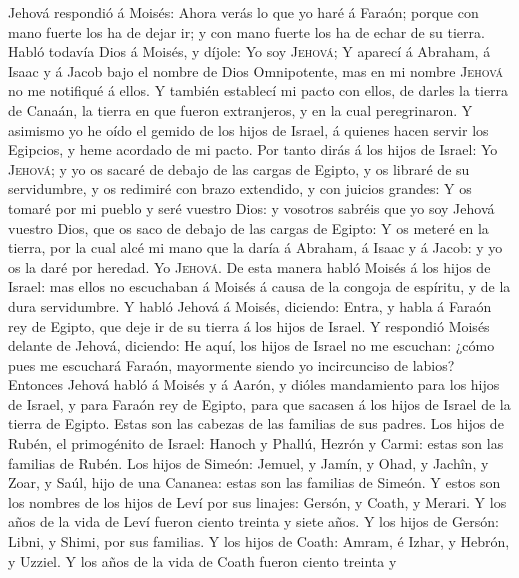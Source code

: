  Jehová respondió á Moisés: Ahora verás lo que yo haré á
Faraón; porque con mano fuerte los ha de dejar ir; y con mano fuerte los
ha de echar de su tierra.  Habló todavía Dios á Moisés, y
díjole: Yo soy \textsc{Jehová};  Y aparecí á Abraham, á
Isaac y á Jacob bajo el nombre de Dios Omnipotente, mas en mi nombre
\textsc{Jehová} no me notifiqué á ellos.  Y también
establecí mi pacto con ellos, de darles la tierra de Canaán, la tierra
en que fueron extranjeros, y en la cual peregrinaron.  Y
asimismo yo he oído el gemido de los hijos de Israel, á quienes hacen
servir los Egipcios, y heme acordado de mi pacto.  Por
tanto dirás á los hijos de Israel: Yo \textsc{Jehová}; y yo os sacaré de
debajo de las cargas de Egipto, y os libraré de su servidumbre, y os
redimiré con brazo extendido, y con juicios grandes:  Y os
tomaré por mi pueblo y seré vuestro Dios: y vosotros sabréis que yo soy
Jehová vuestro Dios, que os saco de debajo de las cargas de Egipto:
 Y os meteré en la tierra, por la cual alcé mi mano que la
daría á Abraham, á Isaac y á Jacob: y yo os la daré por heredad. Yo
\textsc{Jehová}.  De esta manera habló Moisés á los hijos
de Israel: mas ellos no escuchaban á Moisés á causa de la congoja de
espíritu, y de la dura servidumbre.  Y habló Jehová á
Moisés, diciendo:  Entra, y habla á Faraón rey de Egipto,
que deje ir de su tierra á los hijos de Israel.  Y
respondió Moisés delante de Jehová, diciendo: He aquí, los hijos de
Israel no me escuchan: ¿cómo pues me escuchará Faraón, mayormente siendo
yo incircunciso de labios?  Entonces Jehová habló á
Moisés y á Aarón, y dióles mandamiento para los hijos de Israel, y para
Faraón rey de Egipto, para que sacasen á los hijos de Israel de la
tierra de Egipto.  Estas son las cabezas de las familias
de sus padres. Los hijos de Rubén, el primogénito de Israel: Hanoch y
Phallú, Hezrón y Carmi: estas son las familias de Rubén. 
Los hijos de Simeón: Jemuel, y Jamín, y Ohad, y Jachîn, y Zoar, y Saúl,
hijo de una Cananea: estas son las familias de Simeón.  Y
estos son los nombres de los hijos de Leví por sus linajes: Gersón, y
Coath, y Merari. Y los años de la vida de Leví fueron ciento treinta y
siete años.  Y los hijos de Gersón: Libni, y Shimi, por
sus familias.  Y los hijos de Coath: Amram, é Izhar, y
Hebrón, y Uzziel. Y los años de la vida de Coath fueron ciento treinta y
